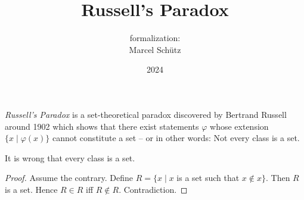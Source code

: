 \documentclass{article}
\title{Russell's Paradox}
\author{\Naproche formalization: \vspace{0.5em} \\
Marcel Schütz}
\date{2024}
\begin{document}
  \maketitle

  \noindent \emph{Russell's Paradox} is a set-theoretical paradox discovered by
  Bertrand Russell around 1902 \cite[chapter XV]{Frege1980} which shows that 
  there exist statements $\varphi$ whose extension
  $\{x\mid\varphi(x)\}$ cannot constitute a set -- or in other words:
  Not every class is a set.

  \begin{forthel}
    \begin{theorem*}\label{russell_paradox}
      It is wrong that every class is a set.
    \end{theorem*}
    \begin{proof}
      Assume the contrary.
      Define $R = \{x \mid x$ is a set such that $x \notin x\}$.
      Then $R$ is a set.
      Hence $R \in R$ iff $R \notin R$.
      Contradiction.
    \end{proof}
  \end{forthel}

  \printbibliography
\end{document}
